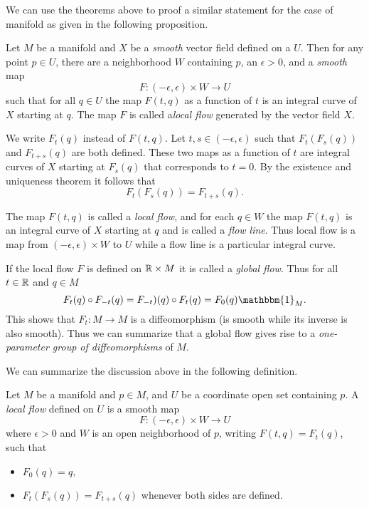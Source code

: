 We can use the theorems above to proof a similar statement for the case of manifold as given in the following proposition.

\begin{proposition}
	Let $ M $ be a manifold and $ X $ be a \emph{smooth} vector field defined on a $ U $. Then for any point $ p \in U $, there are a neighborhood $ W $ containing $ p $, an $ \epsilon>0 $, and a \emph{smooth} map 
	\[ F: (-\epsilon,\epsilon) \times W \to U \]
	such that for all $ q \in U $ the map $ F(t,q) $ as a function of $ t $ is an integral curve of $ X $ starting at $ q $. The map $ F $ is called a\emph{local flow} generated by the vector field $ X $.
\end{proposition}
\begin{remark}
	We write $ F_t(q) $ instead of $ F(t,q) $. Let $ t,s \in (-\epsilon,\epsilon) $ such that $ F_t(F_s(q)) $ and $ F_{t+s}(q) $ are both defined. These two maps as a function of $ t $ are integral curves of $ X $ starting at $ F_s(q) $ that corresponds to $ t = 0 $. By the existence and uniqueness theorem it follows that 
	\[ F_t(F_s(q)) = F_{t+s}(q). \]
\end{remark}
\begin{remark}
	The map $ F(t,q) $ is called a \emph{local flow}, and for each $ q \in W $ the map $ F(t,q) $ is an integral curve of $ X $ starting at $ q $ and is called a \emph{flow line}. Thus local flow is a map from $ (-\epsilon,\epsilon)\times W $ to $ U $ while a flow line is a particular integral curve.
\end{remark}
\begin{remark}
	If the local flow $ F $ is defined on $ \mathbb{R}\times M $ it is called a \emph{global flow}. Thus for all $ t \in \mathbb{R} $ and $ q \in M $
	\[ F_t(q) \circ F_{-t}(q) = F_{-t})(q) \circ F_{t}(q) = F_0(q) \mathbbm{1}_M. \]
	This shows that $ F_t : M\to M $ is a diffeomorphism (is smooth while its inverse is also smooth). Thus we can summarize that a global flow gives rise to a \emph{one-parameter group of diffeomorphisms} of $ M $. 
\end{remark}

We can summarize the discussion above in the following definition.
\begin{definition}
	Let $ M $ be a manifold and $ p \in M $, and $ U $ be a coordinate open set containing $ p $. A \emph{local flow} defined on $ U $ is a smooth map 
	\[ F: (-\epsilon,\epsilon) \times W \to U \]
	where $ \epsilon>0 $ and $ W $ is an open neighborhood of $ p $, writing $ F(t,q) = F_t(q) $, such that 
	\begin{itemize}[noitemsep]
		\item $ F_0(q) = q, $
		\item $ F_t(F_s(q)) = F_{t+s}(q) $ whenever both sides are defined.
	\end{itemize} 
\end{definition}

